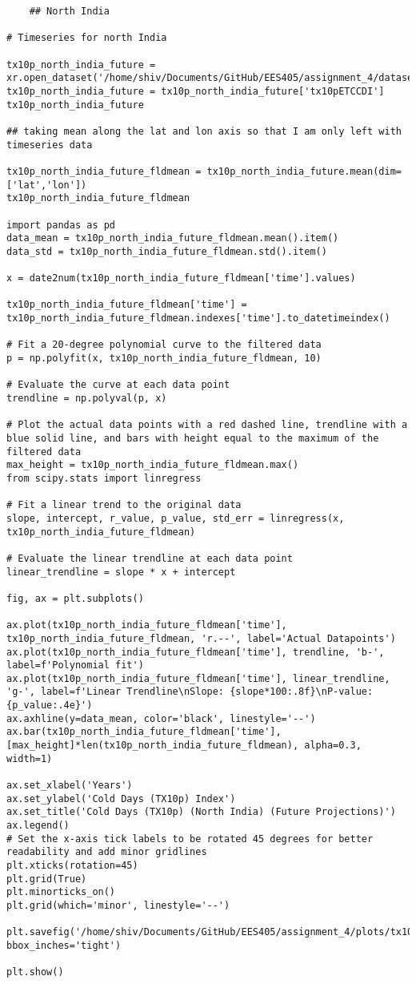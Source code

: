\documentclass[a4paper, 12pt, twoside]{report}
\begin{document}
\begin{lstlisting}
    ## North India 

# Timeseries for north India

tx10p_north_india_future = xr.open_dataset('/home/shiv/Documents/GitHub/EES405/assignment_4/datasets/tx10p.future.north_india.nc')
tx10p_north_india_future = tx10p_north_india_future['tx10pETCCDI']
tx10p_north_india_future

## taking mean along the lat and lon axis so that I am only left with timeseries data 

tx10p_north_india_future_fldmean = tx10p_north_india_future.mean(dim=['lat','lon'])
tx10p_north_india_future_fldmean

import pandas as pd
data_mean = tx10p_north_india_future_fldmean.mean().item()
data_std = tx10p_north_india_future_fldmean.std().item()

x = date2num(tx10p_north_india_future_fldmean['time'].values)

tx10p_north_india_future_fldmean['time'] = tx10p_north_india_future_fldmean.indexes['time'].to_datetimeindex()

# Fit a 20-degree polynomial curve to the filtered data
p = np.polyfit(x, tx10p_north_india_future_fldmean, 10)

# Evaluate the curve at each data point
trendline = np.polyval(p, x)

# Plot the actual data points with a red dashed line, trendline with a blue solid line, and bars with height equal to the maximum of the filtered data
max_height = tx10p_north_india_future_fldmean.max()
from scipy.stats import linregress

# Fit a linear trend to the original data
slope, intercept, r_value, p_value, std_err = linregress(x, tx10p_north_india_future_fldmean)

# Evaluate the linear trendline at each data point
linear_trendline = slope * x + intercept

fig, ax = plt.subplots()

ax.plot(tx10p_north_india_future_fldmean['time'], tx10p_north_india_future_fldmean, 'r.--', label='Actual Datapoints')
ax.plot(tx10p_north_india_future_fldmean['time'], trendline, 'b-', label=f'Polynomial fit')
ax.plot(tx10p_north_india_future_fldmean['time'], linear_trendline, 'g-', label=f'Linear Trendline\nSlope: {slope*100:.8f}\nP-value: {p_value:.4e}')
ax.axhline(y=data_mean, color='black', linestyle='--')
ax.bar(tx10p_north_india_future_fldmean['time'], [max_height]*len(tx10p_north_india_future_fldmean), alpha=0.3, width=1)

ax.set_xlabel('Years')
ax.set_ylabel('Cold Days (TX10p) Index')
ax.set_title('Cold Days (TX10p) (North India) (Future Projections)')
ax.legend()
# Set the x-axis tick labels to be rotated 45 degrees for better readability and add minor gridlines
plt.xticks(rotation=45)
plt.grid(True)
plt.minorticks_on()
plt.grid(which='minor', linestyle='--')

plt.savefig('/home/shiv/Documents/GitHub/EES405/assignment_4/plots/tx10p.north_india_fut.png',dpi=600, bbox_inches='tight')

plt.show()

\end{lstlisting}
\end{document}
